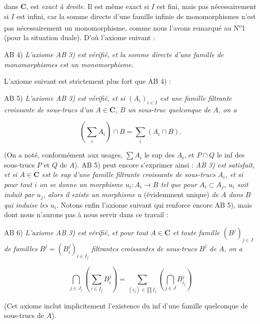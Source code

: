 
\noindent dans $\mathbf{C}$, est \textit{exact à droite}. Il est même exact si $I$ est
fini, mais pas nécessairement si $I$ est infini, car la somme directe d'une
famille infinie de monomorphismes n'est pas nécessairement un monomorphisme,
comme nous l'avons remarqué au N\textsuperscript{o}1 (pour la situation duale).
D'où l'axiome suivant :

\noindent AB 4) \textit{L'axiome \textup{AB 3)} est vérifié, et la somme directe
d'une famille de monomorphismes est un monomorphisme.}

L'axiome suivant est strictement plus fort que AB 4) :

\noindent AB 5) \textit{L'axiome \textup{AB 3)} est vérifié, et si
$(A_i)_{i\in I}$ est une famille filtrante croissante de sous-trucs d'un
$A\in\mathbf{C}$, $B$ un sous-truc quelconque de $A$, on a}

\[
  \left(\sum_i A_i\right)\cap B=\sum_i(A_i\cap B).
\]

\noindent (On a noté, conformément aux usages, $\displaystyle\sum A_i$ le sup des $A_i$, et
$P\cap Q$ le inf des sous-trucs $P$ et $Q$ de $A$).
AB 5) peut encore s'exprimer ainsi : \textit{\textup{AB 3)} est satisfait, et si
$A\in\mathbf{C}$ est le sup d'une famille filtrante croissante de sous-trucs $A_i$, et
si pour tout $i$ on se donne un morphisme
$u_i:A_i\to B$ tel que pour $A_i\subset A_j$, $u_i$ soit induit
par $u_j$, alors il existe un morphisme $u$} (évidemment unique) \textit{de $A$
dans $B$ qui induise les $u_i$}. Notons enfin l'axiome suivant qui renforce
encore AB 5), mais dont nous n'aurons pas à nous servir dans ce travail :

\noindent AB 6) \textit{L'axiome \textup{AB 3)} est vérifié, et pour tout
$A\in\mathbf{C}$ et toute famille $(B^j)_{j\in J}$ de familles
$B^j=(B_i^j)_{i\in I_j}$ filtrantes croissantes de sous-trucs $B^j$ de $A$,
on a}

\[
 \bigcap_{j\in J_j}\left(\sum_{i\in I_j}B_i^j\right)
 =\sum_{(i_j)\in\prod I_j}
   \left(\bigcap_{j\in J}B_{i_j}^j\right)
\]

\noindent (Cet axiome inclut implicitement l'existence du inf d'une famille
quelconque de sous-trucs de $A$).

